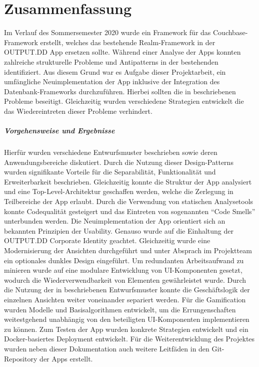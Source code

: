 \chapter{Zusammenfassung}\label{ch:zusammenfassung}

Im Verlauf des Sommersemester 2020 wurde ein Framework für das Couchbase-Framework erstellt, welches das bestehende Realm-Framework in der OUTPUT.DD App ersetzen sollte. Während einer Analyse der Apps konnten zahlreiche strukturelle Probleme und Antipatterns in der bestehenden identifiziert. Aus diesem Grund war es Aufgabe dieser Projektarbeit, ein umfängliche Neuimplementation der App inklusive der Integration des Datenbank-Frameworks durchzuführen. Hierbei sollten die in  beschriebenen Probleme beseitigt. Gleichzeitig wurden verschiedene Strategien entwickelt die das Wiedereintreten dieser Probleme verhindert. 

\paragraph{Vorgehensweise und Ergebnisse} Hierfür wurden verschiedene Entwurfsmuster beschrieben sowie deren Anwendungsbereiche diskutiert. Durch die Nutzung dieser Design-Patterns wurden signifikante Vorteile für die Separabilität, Funktionalität und Erweiterbarkeit beschrieben. Gleichzeitig konnte die Struktur der App analysiert und eine Top-Level-Architektur geschaffen werden, welche die Zerlegung in Teilbereiche der App erlaubt. Durch die Verwendung von statischen Analysetools konnte Codequalität gesteigert und das Eintreten von sogenannten \enquote{Code Smells} unterbunden werden. Die Neuimplementation der App orientiert sich an bekannten Prinzipien der Usability. Genauso wurde auf die Einhaltung der OUTPUT.DD Corporate Identity geachtet. Gleichzeitig wurde eine Modernisierung der Ansichten durchgeführt und unter Absprach im Projektteam ein optionales dunkles Design eingeführt. Um redundanten Arbeitsaufwand zu minieren wurde auf eine modulare Entwicklung von UI-Komponenten gesetzt, wodurch die Wiederverwendbarkeit von Elementen gewährleistet wurde. Durch die Nutzung der in  beschriebenen Entwurfsmuster konnte die Geschäftslogik der einzelnen Ansichten weiter voneinander separiert werden. Für die Gamification wurden Modelle und Basisalgorithmen entwickelt, um die Errungenschaften weitestgehend unabhängig von den beteiligten UI-Komponenten implementieren zu können. Zum Testen der App wurden konkrete Strategien entwickelt und ein Docker-basiertes Deployment entwickelt. Für die Weiterentwicklung des Projektes wurden neben dieser Dokumentation auch weitere Leitfäden in den Git-Repository der Apps erstellt.

